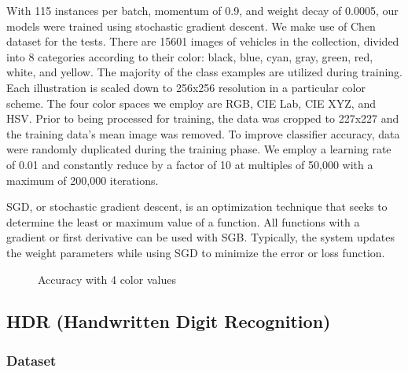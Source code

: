 \documentclass[letterpaper, 10 pt, conference]{ieeeconf}  %
\begin{document}
With 115 instances per batch, momentum of 0.9, and weight decay of 0.0005, our models were trained using stochastic gradient descent. We make use of Chen dataset for the tests. There are 15601 images of vehicles in the collection, divided into 8 categories according to their color: black, blue, cyan, gray, green, red, white, and yellow. The majority of the class examples are utilized during training. Each illustration is scaled down to 256x256 resolution in a particular color scheme. The four color spaces we employ are RGB, CIE Lab, CIE XYZ, and HSV. Prior to being processed for training, the data was cropped to 227x227 and the training data's mean image was removed. To improve classifier accuracy, data were randomly duplicated during the training phase. We employ a learning rate of 0.01 and constantly reduce by a factor of 10 at multiples of 50,000 with a maximum of 200,000 iterations. \par

SGD, or stochastic gradient descent, is an optimization technique that seeks to determine the least or maximum value of a function. All functions with a gradient or first derivative can be used with SGB. Typically, the system updates the weight parameters while using SGD to minimize the error or loss function. \par

\begin{figure}[thpb]
      \centering
      \caption{Accuracy with 4 color values}
      \label{fig:1}
\end{figure}

\subsection*{\bf HDR (Handwritten Digit Recognition)}
\subsubsection*{\bf Dataset}
\end{document}
